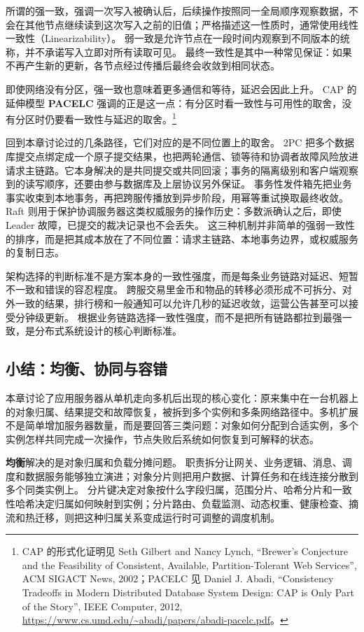 所谓的强一致，强调一次写入被确认后，后续操作按照同一全局顺序观察数据，不会在其他节点继续读到这次写入之前的旧值；严格描述这一性质时，通常使用线性一致性（Linearizability）。
弱一致是允许节点在一段时间内观察到不同版本的统称，并不承诺写入立即对所有读取可见。
最终一致性是其中一种常见保证：如果不再产生新的更新，各节点经过传播后最终会收敛到相同状态。

即使网络没有分区，强一致也意味着更多通信和等待，延迟会因此上升。
CAP 的延伸模型 \textbf{PACELC} 强调的正是这一点：有分区时看一致性与可用性的取舍，没有分区时仍要看一致性与延迟的取舍。\footnote{CAP 的形式化证明见 Seth Gilbert and Nancy Lynch, ``Brewer's Conjecture and the Feasibility of Consistent, Available, Partition-Tolerant Web Services'', ACM SIGACT News, 2002；PACELC 见 Daniel J. Abadi, ``Consistency Tradeoffs in Modern Distributed Database System Design: CAP is Only Part of the Story'', IEEE Computer, 2012, \url{https://www.cs.umd.edu/~abadi/papers/abadi-pacelc.pdf}。}

回到本章讨论过的几条路径，它们对应的是不同位置上的取舍。
2PC 把多个数据库提交点绑定成一个原子提交结果，也把两轮通信、锁等待和协调者故障风险放进请求主链路。它本身解决的是共同提交或共同回滚；事务的隔离级别和客户端观察到的读写顺序，还要由参与数据库及上层协议另外保证。
事务性发件箱先把业务事实收束到本地事务，再把跨服传播放到异步阶段，用幂等重试换取最终收敛。
Raft 则用于保护协调服务器这类权威服务的操作历史：多数派确认之后，即使 Leader 故障，已提交的裁决记录也不会丢失。
这三种机制并非简单的强弱一致性的排序，而是把其成本放在了不同位置：请求主链路、本地事务边界，或权威服务的复制日志。

架构选择的判断标准不是方案本身的一致性强度，而是每条业务链路对延迟、短暂不一致和错误的容忍程度。
跨服交易里金币和物品的转移必须形成不可拆分、对外一致的结果，排行榜和一般通知可以允许几秒的延迟收敛，运营公告甚至可以接受分钟级更新。
根据业务链路选择一致性强度，而不是把所有链路都拉到最强一致，是分布式系统设计的核心判断标准。


\subsection{小结：均衡、协同与容错}\label{sec4:summary}

本章讨论了应用服务器从单机走向多机后出现的核心变化：原来集中在一台机器上的对象归属、结果提交和故障恢复，被拆到多个实例和多条网络路径中。多机扩展不是简单增加服务器数量，而是要回答三类问题：对象如何分配到合适实例，多个实例怎样共同完成一次操作，节点失败后系统如何恢复到可解释的状态。

\textbf{均衡}解决的是对象归属和负载分摊问题。
职责拆分让网关、业务逻辑、消息、调度和数据服务能够独立演进；对象分片则把用户数据、计算任务和在线连接分散到多个同类实例上。
分片键决定对象按什么字段归属，范围分片、哈希分片和一致性哈希决定归属如何映射到实例；分片路由、负载监测、动态权重、健康检查、摘流和热迁移，则把这种归属关系变成运行时可调整的调度机制。

